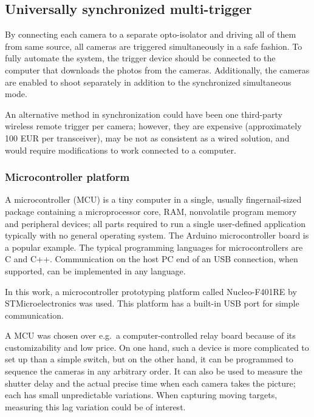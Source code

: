 
\subsection{Universally synchronized multi-trigger} %

By connecting each camera to a separate opto-isolator and driving all of them from same source, all cameras are triggered simultaneously in a safe fashion.
To fully automate the system, the trigger device should be connected to the computer that downloads the photos from the cameras.
Additionally, the cameras are enabled to shoot separately in addition to the synchronized simultaneous mode.

An alternative method in synchronization could have been one third-party wireless remote trigger per camera;
however, they are expensive (approximately 100 EUR per transceiver), may be not as consistent as a wired solution, and would require modifications to work connected to a computer.

\subsubsection{Microcontroller platform}

A microcontroller (MCU) is a tiny computer in a single, usually fingernail-sized package containing a microprocessor core, RAM, nonvolatile program memory and peripheral devices; all parts required to run a single user-defined application typically with no general operating system.
The Arduino microcontroller board is a popular example.
The typical programming languages for microcontrollers are C and C++.
Communication on the host PC end of an USB connection, when supported, can be implemented in any language.

In this work, a microcontroller prototyping platform called Nucleo-F401RE by STMicroelectronics \cite{stnucleo} was used.
This platform has a built-in USB port for simple communication.

A MCU was chosen over e.g.\ a computer-controlled relay board because of its customizability and low price.
On one hand, such a device is more complicated to set up than a simple switch, but on the other hand, it can be programmed to sequence the cameras in any arbitrary order.
It can also be used to measure the shutter delay and the actual precise time when each camera takes the picture; each has small unpredictable variations.
When capturing moving targets, measuring this lag variation could be of interest.

